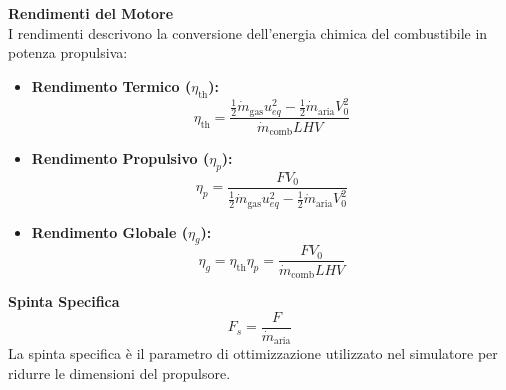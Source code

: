 \textbf{Rendimenti del Motore} \\
I rendimenti descrivono la conversione dell'energia chimica del combustibile in potenza propulsiva:
\begin{itemize}
    \item \textbf{Rendimento Termico ($\eta_{\text{th}}$):} 
    \begin{equation*}
        \eta_{\text{th}} = \frac{\frac{1}{2} \dot{m}_{\text{gas}} u_{eq}^2 - \frac{1}{2} \dot{m}_{\text{aria}} V_0^2}{\dot{m}_{\text{comb}} LHV}
    \end{equation*}

    \item \textbf{Rendimento Propulsivo ($\eta_p$):} 
    \begin{equation*}
        \eta_p = \frac{F V_0}{\frac{1}{2} \dot{m}_{\text{gas}} u_{eq}^2 - \frac{1}{2} \dot{m}_{\text{aria}} V_0^2}
    \end{equation*}

    \item \textbf{Rendimento Globale ($\eta_g$):} 
    \begin{equation*}
        \eta_g = \eta_\text{th}\eta_p= \frac{F V_0}{\dot{m}_{\text{comb}} LHV}
    \end{equation*}
\end{itemize}

\textbf{Spinta Specifica}
\begin{equation*}
    F_s = \frac{F}{\dot{m}_{\text{aria}}}
\end{equation*}
La spinta specifica è il parametro di ottimizzazione utilizzato nel simulatore per ridurre le dimensioni del propulsore. 